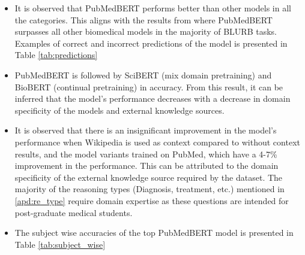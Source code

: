 \documentclass[pmlr,twocolumn,10pt]{jmlr}
\begin{document}
\begin{itemize}
    \item It is observed that PubMedBERT performs better than other models in all the categories. This aligns with the results from \citep{Gu2020} where PubMedBERT surpasses all other biomedical models in the majority of BLURB  tasks. Examples of correct and incorrect predictions of the model is presented in Table \ref{tab:predictions}
    
    \item PubMedBERT is followed by SciBERT (mix domain pretraining) and BioBERT (continual pretraining) in accuracy. From this result, it can be inferred that the model's performance decreases with a decrease in domain specificity of the models and external knowledge sources.
    \item It is observed that there is an insignificant improvement in the model's performance when Wikipedia is used as context compared to without context results, and the model variants trained on PubMed, which have a 4-7\% improvement in the performance. This can be attributed to the domain specificity of the external knowledge source required by the dataset. The majority of the reasoning types (Diagnosis, treatment, etc.) mentioned in \ref{apd:re_type} require domain expertise as these questions are intended for post-graduate medical students.
    \item The subject wise accuracies of the top PubMedBERT model is presented in Table \ref{tab:subject_wise}
\end{itemize}
\end{document}
